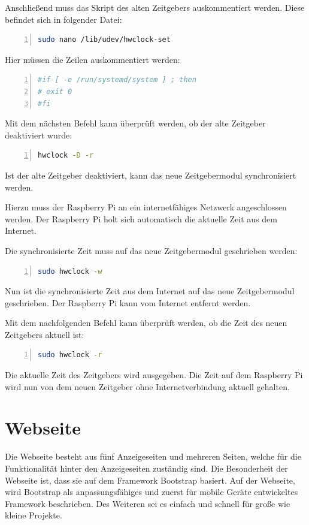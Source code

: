 Anschließend muss das Skript des alten Zeitgebers auskommentiert werden. Diese befindet sich in folgender Datei:
\begin{lstlisting}[caption=Zeitgeber Skript,frame=single,numbers=left,language=bash,showstringspaces=false]
sudo nano /lib/udev/hwclock-set
\end{lstlisting}
Hier müssen die Zeilen auskommentiert werden:
\begin{lstlisting}[caption=Auskommentieren in Zeitgeber Skript,frame=single,numbers=left,language=bash,showstringspaces=false]
#if [ -e /run/systemd/system ] ; then
# exit 0
#fi
\end{lstlisting}
Mit dem nächsten Befehl kann überprüft werden, ob der alte Zeitgeber deaktiviert wurde:
\begin{lstlisting}[caption=Überprüfung des alten Zeitgebers,frame=single,numbers=left,language=bash,showstringspaces=false]
hwclock -D -r
\end{lstlisting}
Ist der alte Zeitgeber deaktiviert, kann das neue Zeitgebermodul synchronisiert werden.

Hierzu muss der Raspberry Pi an ein internetfähiges Netzwerk angeschlossen werden. Der Raspberry Pi holt sich automatisch die aktuelle Zeit aus dem Internet.

Die synchronisierte Zeit muss auf das neue Zeitgebermodul geschrieben werden:
\begin{lstlisting}[caption=Schreiben der Zeit auf das Zeitgebermodul,frame=single,numbers=left,language=bash,showstringspaces=false]
sudo hwclock -w
\end{lstlisting}
Nun ist die synchronisierte Zeit aus dem Internet auf das neue Zeitgebermodul geschrieben. Der Raspberry Pi kann vom Internet entfernt werden.

Mit dem nachfolgenden Befehl kann überprüft werden, ob die Zeit des neuen Zeitgebers aktuell ist:
\begin{lstlisting}[caption=Lesen der Zeit auf das Zeitgebermodul,frame=single,numbers=left,language=bash,showstringspaces=false]
sudo hwclock -r
\end{lstlisting}
Die aktuelle Zeit des Zeitgebers wird ausgegeben. Die Zeit auf dem Raspberry Pi wird nun von dem neuen Zeitgeber ohne Internetverbindung aktuell gehalten.
\section{Webseite} \label{Webseite}
Die Webseite besteht aus fünf Anzeigeseiten und mehreren Seiten, welche für die Funktionalität hinter den Anzeigeseiten zuständig sind. Die Besonderheit der Webseite ist, dass sie auf dem Framework Bootstrap basiert. 
Auf der \cite{Bootstrap} Webseite, wird Bootstrap als anpassungsfähiges und zuerst für mobile Geräte entwickeltes Framework beschrieben. Des Weiteren sei es einfach und schnell für große wie kleine Projekte.

